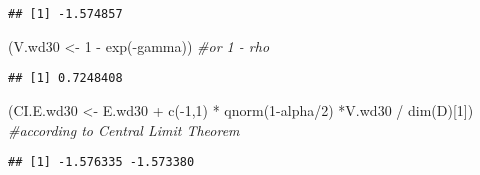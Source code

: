 \documentclass[
]{article}
\newenvironment{Shaded}{\begin{snugshade}}{\end{snugshade}}
\newcommand{\CommentTok}[1]{\textcolor[rgb]{0.56,0.35,0.01}{\textit{#1}}}
\newcommand{\DecValTok}[1]{\textcolor[rgb]{0.00,0.00,0.81}{#1}}
\newcommand{\FunctionTok}[1]{\textcolor[rgb]{0.00,0.00,0.00}{#1}}
\newcommand{\NormalTok}[1]{#1}
\newcommand{\OtherTok}[1]{\textcolor[rgb]{0.56,0.35,0.01}{#1}}
\newcommand{\SpecialCharTok}[1]{\textcolor[rgb]{0.00,0.00,0.00}{#1}}
\begin{document}
\begin{Shaded}
\end{Shaded}

\begin{verbatim}
## [1] -1.574857
\end{verbatim}

\begin{Shaded}
\begin{Highlighting}[]
\NormalTok{(V.wd30 }\OtherTok{\textless{}{-}} \DecValTok{1} \SpecialCharTok{{-}} \FunctionTok{exp}\NormalTok{(}\SpecialCharTok{{-}}\NormalTok{gamma)) }\CommentTok{\#or 1 {-} rho}
\end{Highlighting}
\end{Shaded}

\begin{verbatim}
## [1] 0.7248408
\end{verbatim}

\begin{Shaded}
\begin{Highlighting}[]
\NormalTok{(CI.E.wd30 }\OtherTok{\textless{}{-}}\NormalTok{ E.wd30 }\SpecialCharTok{+} \FunctionTok{c}\NormalTok{(}\SpecialCharTok{{-}}\DecValTok{1}\NormalTok{,}\DecValTok{1}\NormalTok{) }\SpecialCharTok{*} \FunctionTok{qnorm}\NormalTok{(}\DecValTok{1}\SpecialCharTok{{-}}\NormalTok{alpha}\SpecialCharTok{/}\DecValTok{2}\NormalTok{) }\SpecialCharTok{*}\NormalTok{V.wd30 }\SpecialCharTok{/} \FunctionTok{dim}\NormalTok{(D)[}\DecValTok{1}\NormalTok{]) }\CommentTok{\#according to Central Limit Theorem}
\end{Highlighting}
\end{Shaded}

\begin{verbatim}
## [1] -1.576335 -1.573380
\end{verbatim}
\end{document}
